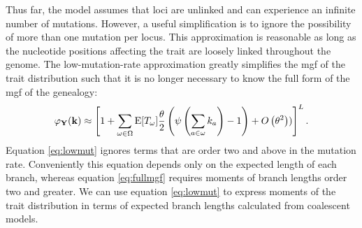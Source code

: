 Thus far, the model assumes that loci are unlinked and can experience an
infinite number of mutations. However, a useful simplification is to ignore the
possibility of more than one mutation per locus. This approximation is
reasonable as long as the nucleotide positions affecting the trait are loosely
linked throughout the genome. The low-mutation-rate approximation greatly
simplifies the mgf of the trait distribution such that it is no longer necessary
to know the full form of the mgf of the genealogy:
\begin{equation}
\label{eq:lowmut}
\varphi_{\mathbf{Y}}(\mathbf{k}) \approx \left[ 1 + \sum_{\omega \in \Omega}
  \mathrm{E}[T_\omega] \frac{\theta}{2} \left( \psi\left( \sum_{a \in \omega} k_a\right) -1 \right) +
  O\left( \theta^2 \right))\right]^L.
\end{equation}
Equation \eqref{eq:lowmut} ignores terms that are order two and above in the
mutation rate. Conveniently this equation depends only on the expected length of
each branch, whereas equation \eqref{eq:fullmgf} requires moments of branch
lengths order two and greater. We can use equation \eqref{eq:lowmut} to express
moments of the trait distribution in terms of expected branch lengths calculated
from coalescent models.

